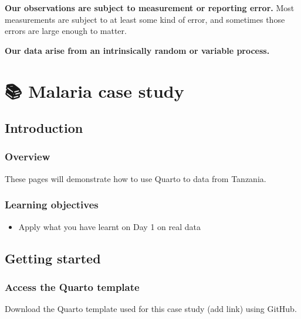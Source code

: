\documentclass[
  letterpaper,
  DIV=11,
  numbers=noendperiod,
  oneside]{scrreprt}
\providecommand{\tightlist}{%
  \setlength{\itemsep}{0pt}\setlength{\parskip}{0pt}}\usepackage{longtable,booktabs,array}
\begin{document}
\textbf{Our observations are subject to measurement or reporting error.}
Most measurements are subject to at least some kind of error, and
sometimes those errors are large enough to matter.

\textbf{Our data arise from an intrinsically random or variable
process.}

\hypertarget{malaria-case-study}{%
\chapter{\texorpdfstring{{📚} Malaria case
study}{📚 Malaria case study}}\label{malaria-case-study}}

\hypertarget{introduction-10}{%
\section{Introduction}\label{introduction-10}}

\hypertarget{overview-6}{%
\subsection{Overview}\label{overview-6}}

These pages will demonstrate how to use Quarto to data from Tanzania.

\hypertarget{learning-objectives-7}{%
\subsection{Learning objectives}\label{learning-objectives-7}}

\begin{itemize}
\tightlist
\item
  Apply what you have learnt on Day 1 on real data
\end{itemize}

\hypertarget{getting-started}{%
\section{Getting started}\label{getting-started}}

\hypertarget{access-the-quarto-template}{%
\subsection{Access the Quarto
template}\label{access-the-quarto-template}}

Download the Quarto template used for this case study (add link) using
GitHub.
\end{document}

